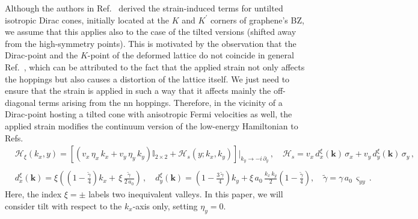 \documentclass[aps,prb, onecolumn, nofootinbib, citeautoscript,10pt]{revtex4-2}
\newcommand{\bs}[1]{\boldsymbol{#1}}
\def \nn{\nonumber \\}
\begin{document}
Although the authors in Ref.~\cite{strained-dirac-franz} derived the strain-induced terms for untilted isotropic Dirac cones, initially located at the $K$ and $K^\prime $ corners of graphene's BZ, we assume that this applies also to the case of the tilted versions (shifted away from the high-symmetry points). This is motivated by the observation that the Dirac-point and the $K$-point of the deformed
lattice do not coincide in general Ref.~\cite{neto-strain-graphene}, which can be attributed to the fact that the applied strain not only affects the hoppings but also causes a distortion of the lattice itself. We just need to ensure that the strain is applied in such a way that it affects mainly the off-diagonal terms arising from the nn hoppings. Therefore, in the vicinity of a Dirac-point hosting a tilted cone with anisotropic Fermi velocities as well, the applied strain modifies the continuum version of the low-energy Hamiltonian to Refs.~\cite{strained-dirac-franz, complex-LL-strained-graphene}
\begin{align}
\label{eqhtot}
& \mathcal H_\xi (k_x, y) = \left[ 
\left(v_x \, \eta_x \, k_x + v_y \,\eta_y\, k_y \right)  {\mathbb I}_{2\times 2} 
+ \mathcal{H}_s(y; k_x, k_y) \right ]\big \vert_{k_y \rightarrow -i\, \partial_y}
\,, \quad 
\mathcal{H}_s  = v_x \, d^\xi_x (\bs k)\,\sigma_x + v_y\,d^\xi_y (\bs k)\,\sigma_y  \,, \nn &
\nn & d^\xi_x(\boldsymbol{k}) = \xi \left( \left (1 - \frac{ \tilde \gamma} {4}\right ) {k}_x 
+\, \xi \, \frac{ \tilde \gamma} {2\, a_0}\right)  \,,
\quad  d^\xi_y(\boldsymbol{k}) =
\left (1 - \frac{3\, \tilde \gamma } {4} \right )  k_y 
+ \xi\, a_0\,\frac{ k_x \, k_y}{2} \left (1 - \frac{\tilde \gamma} {4}  \right ) ,
\quad \tilde \gamma = \gamma\,a_0 \, \varsigma_{yy}\,.
\end{align}
Here, the index $\xi =\pm$ labels two inequivalent valleys. In this paper, we will consider tilt with respect to the $k_x$-axis only, setting $\eta_y = 0 $.
\end{document}
